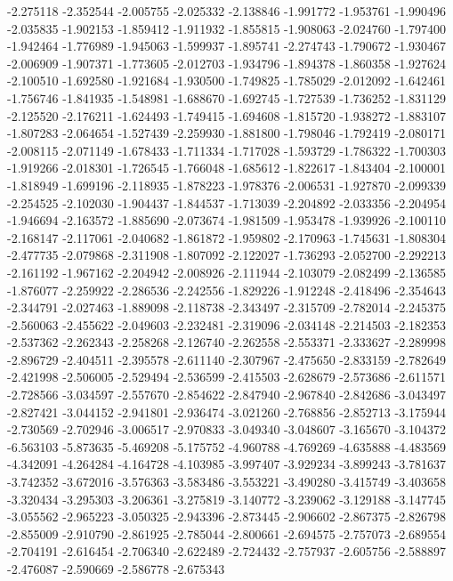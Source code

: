 -2.275118
-2.352544
-2.005755
-2.025332
-2.138846
-1.991772
-1.953761
-1.990496
-2.035835
-1.902153
-1.859412
-1.911932
-1.855815
-1.908063
-2.024760
-1.797400
-1.942464
-1.776989
-1.945063
-1.599937
-1.895741
-2.274743
-1.790672
-1.930467
-2.006909
-1.907371
-1.773605
-2.012703
-1.934796
-1.894378
-1.860358
-1.927624
-2.100510
-1.692580
-1.921684
-1.930500
-1.749825
-1.785029
-2.012092
-1.642461
-1.756746
-1.841935
-1.548981
-1.688670
-1.692745
-1.727539
-1.736252
-1.831129
-2.125520
-2.176211
-1.624493
-1.749415
-1.694608
-1.815720
-1.938272
-1.883107
-1.807283
-2.064654
-1.527439
-2.259930
-1.881800
-1.798046
-1.792419
-2.080171
-2.008115
-2.071149
-1.678433
-1.711334
-1.717028
-1.593729
-1.786322
-1.700303
-1.919266
-2.018301
-1.726545
-1.766048
-1.685612
-1.822617
-1.843404
-2.100001
-1.818949
-1.699196
-2.118935
-1.878223
-1.978376
-2.006531
-1.927870
-2.099339
-2.254525
-2.102030
-1.904437
-1.844537
-1.713039
-2.204892
-2.033356
-2.204954
-1.946694
-2.163572
-1.885690
-2.073674
-1.981509
-1.953478
-1.939926
-2.100110
-2.168147
-2.117061
-2.040682
-1.861872
-1.959802
-2.170963
-1.745631
-1.808304
-2.477735
-2.079868
-2.311908
-1.807092
-2.122027
-1.736293
-2.052700
-2.292213
-2.161192
-1.967162
-2.204942
-2.008926
-2.111944
-2.103079
-2.082499
-2.136585
-1.876077
-2.259922
-2.286536
-2.242556
-1.829226
-1.912248
-2.418496
-2.354643
-2.344791
-2.027463
-1.889098
-2.118738
-2.343497
-2.315709
-2.782014
-2.245375
-2.560063
-2.455622
-2.049603
-2.232481
-2.319096
-2.034148
-2.214503
-2.182353
-2.537362
-2.262343
-2.258268
-2.126740
-2.262558
-2.553371
-2.333627
-2.289998
-2.896729
-2.404511
-2.395578
-2.611140
-2.307967
-2.475650
-2.833159
-2.782649
-2.421998
-2.506005
-2.529494
-2.536599
-2.415503
-2.628679
-2.573686
-2.611571
-2.728566
-3.034597
-2.557670
-2.854622
-2.847940
-2.967840
-2.842686
-3.043497
-2.827421
-3.044152
-2.941801
-2.936474
-3.021260
-2.768856
-2.852713
-3.175944
-2.730569
-2.702946
-3.006517
-2.970833
-3.049340
-3.048607
-3.165670
-3.104372
-6.563103
-5.873635
-5.469208
-5.175752
-4.960788
-4.769269
-4.635888
-4.483569
-4.342091
-4.264284
-4.164728
-4.103985
-3.997407
-3.929234
-3.899243
-3.781637
-3.742352
-3.672016
-3.576363
-3.583486
-3.553221
-3.490280
-3.415749
-3.403658
-3.320434
-3.295303
-3.206361
-3.275819
-3.140772
-3.239062
-3.129188
-3.147745
-3.055562
-2.965223
-3.050325
-2.943396
-2.873445
-2.906602
-2.867375
-2.826798
-2.855009
-2.910790
-2.861925
-2.785044
-2.800661
-2.694575
-2.757073
-2.689554
-2.704191
-2.616454
-2.706340
-2.622489
-2.724432
-2.757937
-2.605756
-2.588897
-2.476087
-2.590669
-2.586778
-2.675343
